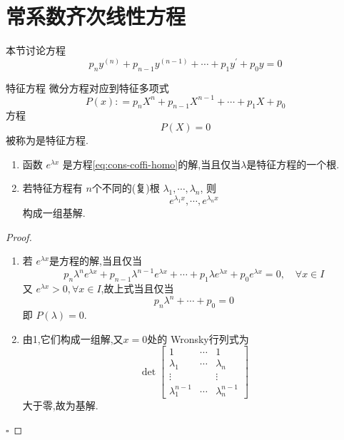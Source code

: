 \documentclass[lang=cn,12pt,color=green,fontset=none]{elegantbook}
\begin{document}
\section{常系数齐次线性方程}


本节讨论方程 \begin{equation}\label{eq:cons-coffi-homo}
    p_{n}y^{\left( n \right) }+ p_{n-1}y^{\left( n-1 \right) }+ \cdots + p_1y^{\prime} + p_0y=0
\end{equation}

\begin{definition}{特征方程}
    微分方程对应到特征多项式 \[
    P\left( x \right): = p_{n}X^{n}+ p_{n-1}X^{n-1}+ \cdots + p_1X+ p_0 
    \]方程 \[
    P\left( X \right)=0 
    \]被称为是特征方程.
\end{definition}

\begin{proposition}
    \begin{enumerate}
        \item 函数 \(  e^{\lambda x}  \) 是方程\ref{eq:cons-coffi-homo}的解,当且仅当\(  \lambda  \)是特征方程的一个根. 
        \item 若特征方程有 \(  n  \)个不同的(复)根 \(   \lambda_1,\cdots,\lambda_n   \),  则 \[
        e^{\lambda_1x},\cdots ,e^{\lambda_nx}       
        \]构成一组基解.
    \end{enumerate}
    
\end{proposition}
\begin{proof}
    \begin{enumerate}
        \item 若 \(  e^{\lambda x}  \)是方程的解,当且仅当\[
        p_{n}\lambda^{n}e^{\lambda x}+ p_{n-1}\lambda^{n-1}e^{\lambda x}+ \cdots + p_1 \lambda e^{\lambda x}+ p_0e^{\lambda x } = 0,\quad \forall x \in I
        \] 又 \(  e^{\lambda x}>0 ,\forall x \in I \),故上式当且仅当 \[
        p_{n}\lambda^{n}+ \cdots + p_0=0
        \] 即 \(  P\left( \lambda \right)=0   \). 
        \item 由1,它们构成一组解,又\(   x= 0  \)处的 Wronsky行列式为 \[
       \det \begin{bmatrix} 
            1 &\cdots & 1\\ 
             \lambda_1&\cdots &\lambda_{n}\\ 
              \vdots & &\vdots\\ 
               \lambda_1^{n-1}&\cdots &\lambda_{n}^{n-1} 
        \end{bmatrix} 
        \]大于零,故为基解.
    \end{enumerate}
    

    \hfill $\square$
\end{proof}
\end{document}
